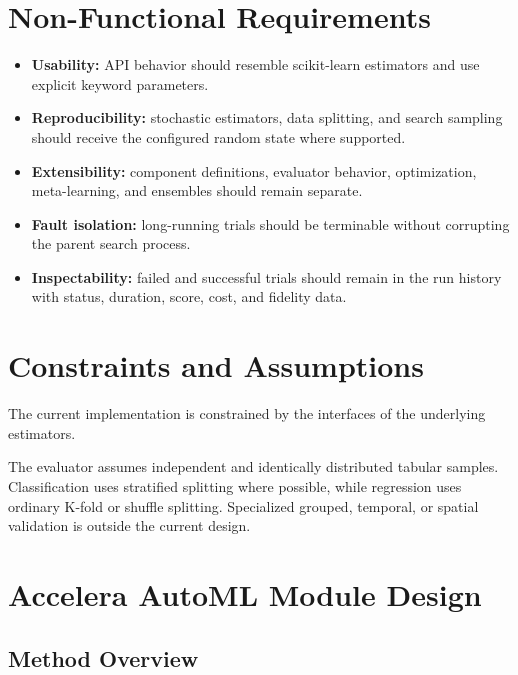 \documentclass[12pt,a4paper,oneside]{report}
\begin{document}
\section{Non-Functional Requirements}

\begin{itemize}[leftmargin=*]
  \item \textbf{Usability:} API behavior should resemble scikit-learn
        estimators and use explicit keyword parameters.
  \item \textbf{Reproducibility:} stochastic estimators, data splitting, and
        search sampling should receive the configured random state where
        supported.
  \item \textbf{Extensibility:} component definitions, evaluator behavior,
        optimization, meta-learning, and ensembles should remain separate.
  \item \textbf{Fault isolation:} long-running trials should be terminable
        without corrupting the parent search process.
  \item \textbf{Inspectability:} failed and successful trials should remain in
        the run history with status, duration, score, cost, and fidelity data.
\end{itemize}

\section{Constraints and Assumptions}

The current implementation is constrained by the interfaces of the underlying
estimators.

\medskip

\noindent The evaluator assumes independent and identically distributed tabular samples.
Classification uses stratified splitting where possible, while regression uses
ordinary K-fold or shuffle splitting. Specialized grouped, temporal, or spatial
validation is outside the current design.


\section{Accelera AutoML Module Design}

\subsection{Method Overview}
\end{document}
